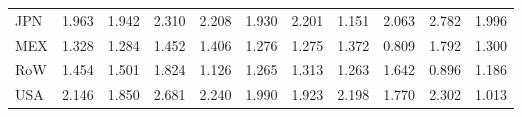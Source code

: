 \begin{table}[htbp]
\begin{tabular}{lcccccccccc}
  JPN & \textcolor[RGB]{66,43,189}{1.963} & \textcolor[RGB]{69,45,186}{1.942} & \textcolor[RGB]{18,12,237}{2.310} & \textcolor[RGB]{33,21,222}{2.208} & \textcolor[RGB]{71,46,184}{1.930} & \textcolor[RGB]{36,23,219}{2.201} & \textcolor[RGB]{224,145,31}{1.151} & \textcolor[RGB]{54,35,201}{2.063} & \textcolor[RGB]{3,2,252}{2.782} & \textcolor[RGB]{59,38,196}{1.996} \\ 
  MEX & \textcolor[RGB]{201,130,54}{1.328} & \textcolor[RGB]{209,135,46}{1.284} & \textcolor[RGB]{184,119,71}{1.452} & \textcolor[RGB]{191,124,64}{1.406} & \textcolor[RGB]{212,137,43}{1.276} & \textcolor[RGB]{214,139,41}{1.275} & \textcolor[RGB]{194,125,61}{1.372} & \textcolor[RGB]{250,162,5}{0.809} & \textcolor[RGB]{97,63,158}{1.792} & \textcolor[RGB]{207,134,48}{1.300} \\ 
  RoW & \textcolor[RGB]{181,117,74}{1.454} & \textcolor[RGB]{173,112,82}{1.501} & \textcolor[RGB]{87,56,168}{1.824} & \textcolor[RGB]{227,147,28}{1.126} & \textcolor[RGB]{217,140,38}{1.265} & \textcolor[RGB]{204,132,51}{1.313} & \textcolor[RGB]{219,142,36}{1.263} & \textcolor[RGB]{138,89,117}{1.642} & \textcolor[RGB]{242,157,13}{0.896} & \textcolor[RGB]{222,144,33}{1.186} \\ 
  USA & \textcolor[RGB]{43,28,212}{2.146} & \textcolor[RGB]{84,54,171}{1.850} & \textcolor[RGB]{5,3,250}{2.681} & \textcolor[RGB]{28,18,227}{2.240} & \textcolor[RGB]{64,41,191}{1.990} & \textcolor[RGB]{79,51,176}{1.923} & \textcolor[RGB]{38,25,217}{2.198} & \textcolor[RGB]{99,64,156}{1.770} & \textcolor[RGB]{23,15,232}{2.302} & \textcolor[RGB]{237,153,18}{1.013} \\ 
   \hline
\end{tabular}
\end{table}

